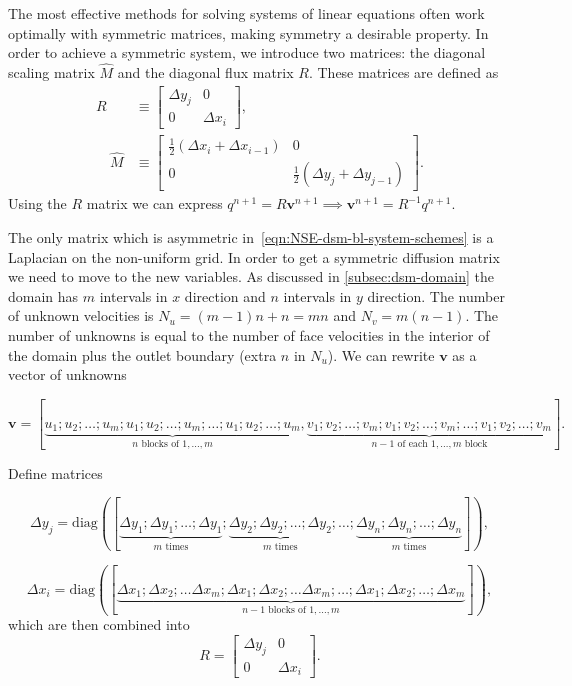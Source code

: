 \documentclass{article}
\begin{document}
The most effective methods for solving systems of linear equations often work optimally with symmetric matrices, making symmetry a desirable property. In order to achieve a symmetric system, we introduce two matrices: the diagonal scaling matrix $\hat{M}$ and the diagonal flux matrix $R$. These matrices are defined as
\begin{align*}
R &\equiv\left[\begin{array}{cc}
\Delta y_j & 0 \\
0 & \Delta x_i
\end{array}\right], \\
\quad \hat{M} & \equiv\left[\begin{array}{cc}
\frac{1}{2}\left(\Delta x_i+\Delta x_{i-1}\right) & 0 \\
0 & \frac{1}{2}\left(\Delta y_j+\Delta y_{j-1}\right)
\end{array}\right].
\end{align*}
Using the $R$ matrix we can express $q^{n+1}=R\boldsymbol{v}^{n+1}\implies \boldsymbol{v}^{n+1}=R^{-1}q^{n+1}$. %

The only matrix which is asymmetric in~\eqref{eqn:NSE-dsm-bl-system-schemes} is a Laplacian on the non-uniform grid. In order to get a symmetric diffusion matrix we need to move to the new variables. As discussed in \ref{subsec:dsm-domain} the domain has $m$ intervals in $x$ direction and $n$ intervals in $y$ direction. The number of unknown velocities is $N_u=(m-1)n+n=mn$ and $N_v=m(n-1)$. The number of unknowns is equal to the number of face velocities in the interior of the domain plus the outlet boundary (extra $n$ in $N_u$). We can rewrite $\boldsymbol{v}$ as a vector of unknowns

$$\boldsymbol{v} = [\underbrace{u_1;u_2;\dotsc;u_{m};u_1;u_2;\dotsc;u_{m};\dotsc;u_1;u_2;\dotsc;u_{m}}_{n\text{ blocks of }1,...,m}, \underbrace{v_1;v_2;\dotsc;v_{m};v_1;v_2;\dotsc;v_{m};\dotsc;v_1;v_2;\dotsc;v_{m}}_{n-1 \text{ of each }1,\dotsc,m\text{ block}}].$$

Define matrices 

$$\Delta y_j=\text{diag}([\underbrace{\Delta y_1; \Delta y_1; \dotsc;\Delta y_1}_{m\text{ times}}; \underbrace{\Delta y_2; \Delta y_2; \dotsc;\Delta y_2}_{m\text{ times}};\dotsc;\underbrace{\Delta y_n; \Delta y_n; \dotsc;\Delta y_n}_{m\text{ times}}]),$$

$$ \Delta x_i=\text{diag}([\underbrace{\Delta x_1; \Delta x_2;\dotsc\Delta x_m;\Delta x_1; \Delta x_2;\dotsc\Delta x_m; \dotsc;\Delta x_1; \Delta x_2;\dotsc;\Delta x_m}_{n-1\text{ blocks of } 1,\dotsc,m}]),$$
which are then combined into
\begin{equation*}
R =\left[\begin{array}{cc}
\Delta y_j & 0 \\
0 & \Delta x_i
\end{array}\right].
\end{equation*}
\end{document}
